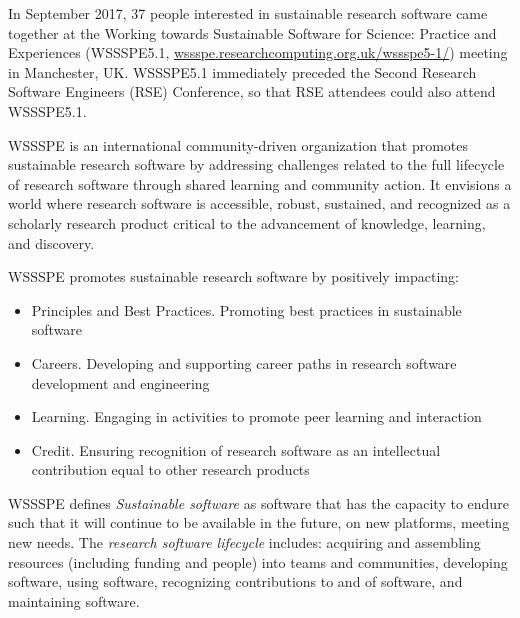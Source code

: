 \documentclass[11pt,letterpaper]{article}
\newcommand{\sdnote}[1]{ {\textcolor{darkgreen}    { ***Stephan: #1 }}}
\begin{document}

In September 2017, 37 people interested in sustainable research software came together at the Working towards Sustainable Software for Science: Practice and Experiences (WSSSPE5.1, \href{http://wssspe.researchcomputing.org.uk/wssspe5-1/}{wssspe.researchcomputing.org.uk/wssspe5-1/}) meeting in Manchester, UK. WSSSPE5.1 immediately preceded the Second Research Software Engineers (RSE) Conference, so that RSE attendees could also attend WSSSPE5.1.






 WSSSPE is an international community-driven organization that promotes sustainable research software by addressing challenges related to the full lifecycle of research software through shared learning and community action.
%
 It envisions a world where research software is accessible, robust, sustained, and recognized as a scholarly research product critical to the advancement of knowledge, learning, and discovery.

 WSSSPE promotes sustainable research software by positively impacting:
 \begin{itemize}
 \item Principles and Best Practices. Promoting best practices in sustainable software
 \item Careers. Developing and supporting career paths in research software development and engineering
 \item Learning. Engaging in activities to promote peer learning and interaction
 \item Credit. Ensuring recognition of research software as an intellectual contribution equal to other research products
 \end{itemize}

WSSSPE defines \emph{Sustainable software} as software that has the capacity to endure such that it will continue to
 be available in the future, on new platforms, meeting new needs.
 The \emph{research software lifecycle} includes:
 acquiring and assembling resources (including funding and people) into teams and communities,
 developing software,
 using software,
 recognizing contributions to and of software,
 and
 maintaining software.
\end{document}
